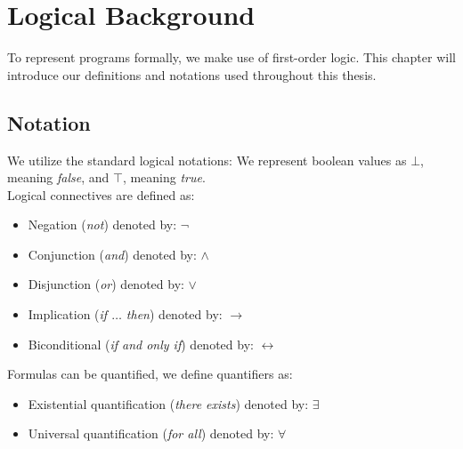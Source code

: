 \section{Logical Background}
To represent programs formally, we make use of first-order logic. This chapter will introduce our definitions and notations used throughout this thesis.

\subsection{Notation}
We utilize the standard logical notations: We represent boolean values as $\bot$, meaning \textsl{false}, and $\top$, meaning \textsl{true}. \\ Logical connectives are defined as:
\begin{itemize}
	\item Negation (\textsl{not}) denoted by: $\neg$
	\item Conjunction (\textsl{and}) denoted by: $\land$
	\item Disjunction (\textsl{or}) denoted by: $\lor$
	\item Implication (\textsl{if $\ldots$ then}) denoted by: $\rightarrow$
	\item Biconditional (\textsl{if and only if}) denoted by: $\leftrightarrow$
\end{itemize}
Formulas can be quantified, we define quantifiers as:
\begin{itemize}
	\item Existential quantification (\textsl{there exists}) denoted by: $\exists$
	\item Universal quantification (\textsl{for all}) denoted by: $\forall$
\end{itemize}

